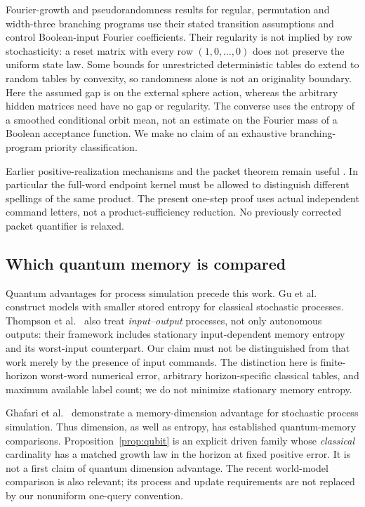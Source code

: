 Fourier-growth and pseudorandomness results for regular, permutation
and width-three branching programs \cite{RSV,SVW,LPV} use their stated
transition assumptions and control Boolean-input Fourier coefficients.
Their regularity is not implied by row stochasticity: a reset matrix
with every row $(1,0,\ldots,0)$ does not preserve the uniform state law.
Some bounds for unrestricted deterministic tables do extend to random
tables by convexity, so randomness alone is not an originality boundary.
Here the assumed gap is on the external sphere action, whereas the
arbitrary hidden matrices need have no gap or regularity. The converse
uses the entropy of a smoothed conditional orbit mean, not an estimate
on the Fourier mass of a Boolean acceptance function. We make no claim
of an exhaustive branching-program priority classification.

Earlier positive-realization mechanisms and the packet theorem remain
useful \cite{GTF35,GTF36}. In particular the full-word endpoint kernel
must be allowed to distinguish different spellings of the same product.
The present one-step proof uses actual independent command letters,
not a product-sufficiency reduction. No previously corrected packet
quantifier is relaxed.

\subsection{Which quantum memory is compared}
Quantum advantages for process simulation precede this work. Gu et al.
\cite{Gu} construct models with smaller stored entropy for classical
stochastic processes. Thompson et al.\ \cite{Thompson} also treat
\emph{input--output} processes, not only autonomous outputs: their
framework includes stationary input-dependent memory entropy and its
worst-input counterpart. Our claim must not be distinguished from that
work merely by the presence of input commands. The distinction here is
finite-horizon worst-word numerical error, arbitrary horizon-specific
classical tables, and maximum available label count; we do not minimize
stationary memory entropy.

Ghafari et al.\ \cite{Ghafari} demonstrate a memory-dimension advantage
for stochastic process simulation. Thus dimension, as well as entropy,
has established quantum-memory comparisons. Proposition~\ref{prop:qubit}
is an explicit driven family whose \emph{classical} cardinality has a
matched growth law in the horizon at fixed positive error. It is not a
first claim of quantum dimension advantage. The recent world-model
comparison \cite{LMTG} is also relevant; its process and update
requirements are not replaced by our nonuniform one-query convention.

